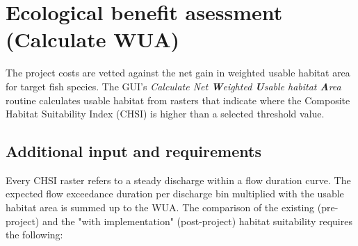 \section{Ecological benefit asessment (Calculate WUA)}\label{sec:pmwua}

The project costs are vetted against the net gain in weighted usable habitat area for target fish species. The GUI's \emph{Calculate Net \textbf{W}eighted \textbf{U}sable habitat \textbf{A}rea} routine calculates usable habitat from rasters that indicate where the Composite Habitat Suitability Index (CHSI) is higher than a selected threshold value.

\subsection{Additional input and requirements}
Every CHSI raster refers to a steady discharge within a flow duration curve. The expected flow exceedance duration per discharge bin multiplied with the usable habitat area is summed up to the WUA. The comparison of the existing (pre-project) and the "with implementation" (post-project) habitat suitability requires the following:

